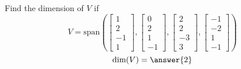 \documentclass{ximera}
\author{}
\begin{document}
\begin{exercise}
Find the dimension of $V$ if $$V=\text{span}\left(\begin{bmatrix}1\\2\\-1\\1\end{bmatrix},\begin{bmatrix}0\\2\\1\\-1\end{bmatrix}, \begin{bmatrix}2\\2\\-3\\3\end{bmatrix}, \begin{bmatrix}-1\\-2\\1\\-1\end{bmatrix}\right) $$
$$\text{dim}(V)=\answer{2}$$
\end{exercise}
\end{document}
